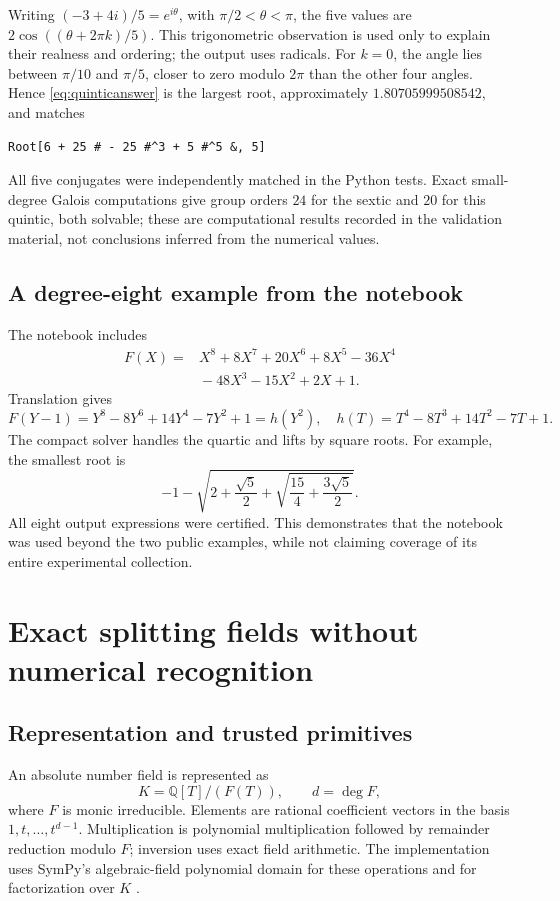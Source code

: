 \documentclass[11pt,letterpaper]{article}
\theoremstyle{definition}\newtheorem{definition}[theorem]{Definition}
\theoremstyle{remark}\newtheorem{remark}[theorem]{Remark}
\newcommand{\Q}{\mathbb Q}\newcommand{\C}{\mathbb C}\newcommand{\Z}{\mathbb Z}
\begin{document}
Writing $(-3+4i)/5=e^{i\theta}$, with $\pi/2<\theta<\pi$, the five values are $2\cos((\theta+2\pi k)/5)$. This trigonometric observation is used only to explain their realness and ordering; the output uses radicals. For $k=0$, the angle lies between $\pi/10$ and $\pi/5$, closer to zero modulo $2\pi$ than the other four angles. Hence \eqref{eq:quinticanswer} is the largest root, approximately $1.80705999508542$, and matches
\begin{lstlisting}
Root[6 + 25 # - 25 #^3 + 5 #^5 &, 5]
\end{lstlisting}
All five conjugates were independently matched in the Python tests. Exact small-degree Galois computations give group orders $24$ for the sextic and $20$ for this quintic, both solvable; these are computational results recorded in the validation material, not conclusions inferred from the numerical values.

\subsection{A degree-eight example from the notebook}
The notebook includes
\begin{align*}
 F(X)={}&X^8+8X^7+20X^6+8X^5-36X^4\\
       &{}-48X^3-15X^2+2X+1.
\end{align*}
Translation gives
\[
 F(Y-1)=Y^8-8Y^6+14Y^4-7Y^2+1=h(Y^2),
\quad h(T)=T^4-8T^3+14T^2-7T+1.
\]
The compact solver handles the quartic and lifts by square roots. For example, the smallest root is
\[
 -1-\sqrt{2+\frac{\sqrt5}{2}+
              \sqrt{\frac{15}{4}+\frac{3\sqrt5}{2}}}.
\]
All eight output expressions were certified. This demonstrates that the notebook was used beyond the two public examples, while not claiming coverage of its entire experimental collection.

\section{Exact splitting fields without numerical recognition}\label{sec:fields}
\subsection{Representation and trusted primitives}
An absolute number field is represented as
\[
 K=\Q[T]/(F(T)),\qquad d=\deg F,
\]
where $F$ is monic irreducible. Elements are rational coefficient vectors in the basis $1,t,\ldots,t^{d-1}$. Multiplication is polynomial multiplication followed by remainder reduction modulo $F$; inversion uses exact field arithmetic. The implementation uses SymPy's algebraic-field polynomial domain for these operations and for factorization over $K$ \cite{sympynumberfields}.
\end{document}
